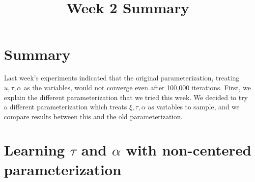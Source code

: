 \documentclass{siamart1116}
\title{Week 2 Summary}
\author{\TheAuthors}
\date{}
\begin{document}
\maketitle
\setlength{\unitlength}{1in}
\setlength{\parindent}{0in}

\section{Summary}
Last week's experiments indicated that the original parameterization, treating $u, \tau, \alpha$ as the variables, would not converge even after 100,000 iterations. First, we explain the different parameterization that we tried this week. We decided to try a different parameterization which treats $\xi, \tau, \alpha$ as variables to sample, and we compare results between this and the old parameterization.

\section{Learning $\tau$ and $\alpha$ with non-centered parameterization}
\end{document}
